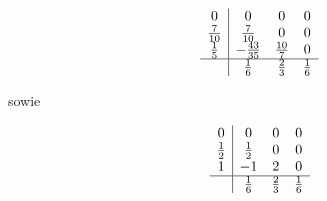 \begin{solution}
\begin{align*}
  \begin{array}{c|ccc}
    0 & 0 & 0 & 0 \\
    \frac{7}{10} & \frac{7}{10} & 0 & 0 \\
    \frac{1}{5} & -\frac{43}{35} & \frac{10}{7} & 0 \\
    \hline
    & \frac{1}{6} & \frac{2}{3} & \frac{1}{6}
  \end{array}
\end{align*}

sowie

\begin{align*}
  \begin{array}{c|ccc}
  0 & 0 & 0 & 0 \\
  \frac{1}{2} & \frac{1}{2} & 0 & 0 \\
  1 & -1 & 2 & 0 \\
  \hline
  & \frac{1}{6} & \frac{2}{3} & \frac{1}{6}
  \end{array}
\end{align*}

\end{solution}
